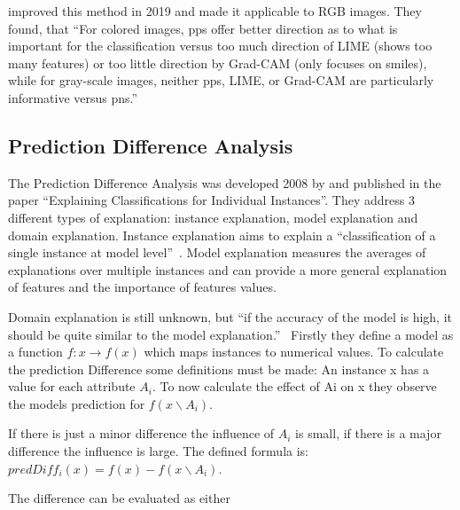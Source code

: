  improved this method in 2019 and made it applicable to RGB images.
They found, that “For colored images, \glspl{pp} offer better direction as to what is important for the classification versus too much direction of LIME (shows too many features) or too little direction by Grad-CAM (only focuses on smiles), while for gray-scale images, neither \glspl{pp}, LIME, or Grad-CAM are particularly informative versus \glspl{pn}.” 

\subsection{Prediction Difference Analysis}
The Prediction Difference Analysis was developed 2008 by  and published in the paper “Explaining Classifications for Individual Instances”. They address 3 different types of explanation: instance explanation, model explanation and domain explanation. Instance explanation aims to explain a “classification of a single instance at model level”~\cite[2]{RobnikSikonja.2008}. Model explanation measures the averages of explanations over multiple instances and can provide a more general explanation of features and the importance of features values.
\par
Domain explanation is still unknown, but “if the accuracy of the model is high, it should be quite similar to the model explanation.”~\cite[2]{RobnikSikonja.2008} Firstly they define a model as a function \(f : x \rightarrow f(x)\) which maps instances to numerical values. To calculate the prediction Difference some definitions must be made: An instance x has a value for each attribute \(A_{i}\). To now calculate the effect of Ai on x they observe the models prediction for  \(f(x \backslash A_{i})\). 
\par
If there is just a minor difference the influence of \(A_{i}\) is small, if there is a major difference the influence is large. The defined formula is: 
\(predDiff_{i} (x) = f(x)− f(x \backslash A_{i})\).
\par
The difference can be evaluated as either
